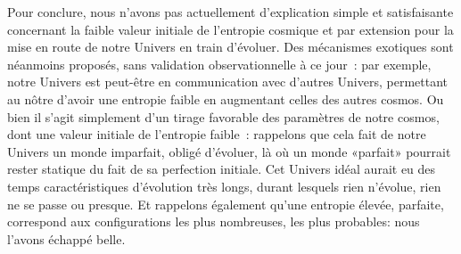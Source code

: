 Pour conclure, nous n'avons pas actuellement d'explication simple et satisfaisante concernant la faible valeur initiale de l'entropie cosmique et par extension pour la mise en route de notre Univers en train d'évoluer. Des mécanismes exotiques sont néanmoins proposés, sans validation observationnelle à ce jour~: par exemple, notre Univers est peut-être en communication avec d'autres Univers, permettant au nôtre d'avoir une entropie faible en augmentant celles des autres cosmos. Ou bien il s'agit simplement d'un tirage favorable des paramètres de notre cosmos, dont une valeur initiale de l'entropie faible~: rappelons que cela fait de notre Univers un monde imparfait, obligé d'évoluer, là où un monde «parfait» pourrait rester statique du fait de sa perfection initiale.  Cet Univers idéal aurait eu des temps caractéristiques d'évolution très longs, durant lesquels rien n'évolue, rien ne se passe ou presque. Et rappelons également qu'une entropie élevée, parfaite, correspond aux configurations les plus nombreuses, les plus probables: nous l'avons échappé belle.